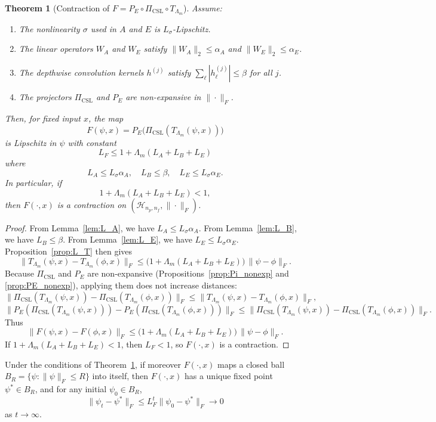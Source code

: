 \documentclass[11pt]{article}
\theoremstyle{definition}
\theoremstyle{plain}
\newtheorem{theorem}{Theorem}
\begin{document}
\begin{theorem}[Contraction of $F = P_E \circ \Pi_{\mathrm{CSL}} \circ T_{\Lambda_m}$]\label{thm:full_contraction}
Assume:
\begin{enumerate}
  \item The nonlinearity $\sigma$ used in $A$ and $E$ is $L_\sigma$-Lipschitz.
  \item The linear operators $W_A$ and $W_E$ satisfy $\|W_A\|_2 \le \alpha_A$ and $\|W_E\|_2 \le \alpha_E$.
  \item The depthwise convolution kernels $h^{(j)}$ satisfy $\sum_\ell |h^{(j)}_\ell| \le \beta$ for all $j$.
  \item The projectors $\Pi_{\mathrm{CSL}}$ and $P_E$ are non-expansive in $\|\cdot\|_F$.
\end{enumerate}
Then, for fixed input $x$, the map
\[
  F(\psi,x) = P_E\bigl(\Pi_{\mathrm{CSL}}(T_{\Lambda_m}(\psi,x))\bigr)
\]
is Lipschitz in $\psi$ with constant
\[
  L_F \le 1 + \Lambda_m(L_A + L_B + L_E)
\]
where
\[
  L_A \le L_\sigma \alpha_A,\quad
  L_B \le \beta,\quad
  L_E \le L_\sigma \alpha_E.
\]
In particular, if
\[
  1 + \Lambda_m(L_A + L_B + L_E) < 1,
\]
then $F(\cdot,x)$ is a contraction on $(\mathcal{H}_{n_p,n_f},\|\cdot\|_F)$.
\end{theorem}

\begin{proof}
From Lemma~\ref{lem:L_A}, we have $L_A \le L_\sigma\alpha_A$.
From Lemma~\ref{lem:L_B}, we have $L_B \le \beta$.
From Lemma~\ref{lem:L_E}, we have $L_E \le L_\sigma\alpha_E$.
Proposition~\ref{prop:L_T} then gives
\[
  \|T_{\Lambda_m}(\psi,x) - T_{\Lambda_m}(\phi,x)\|_F
  \le \bigl(1 + \Lambda_m(L_A+L_B+L_E)\bigr)\,\|\psi - \phi\|_F.
\]
Because $\Pi_{\mathrm{CSL}}$ and $P_E$ are non-expansive (Propositions~\ref{prop:Pi_nonexp} and \ref{prop:PE_nonexp}), applying them does not increase distances:
\[
  \|\Pi_{\mathrm{CSL}}(T_{\Lambda_m}(\psi,x)) - \Pi_{\mathrm{CSL}}(T_{\Lambda_m}(\phi,x))\|_F
  \le \|T_{\Lambda_m}(\psi,x) - T_{\Lambda_m}(\phi,x)\|_F,
\]
\[
  \|P_E(\Pi_{\mathrm{CSL}}(T_{\Lambda_m}(\psi,x))) - P_E(\Pi_{\mathrm{CSL}}(T_{\Lambda_m}(\phi,x)))\|_F
  \le \|\Pi_{\mathrm{CSL}}(T_{\Lambda_m}(\psi,x)) - \Pi_{\mathrm{CSL}}(T_{\Lambda_m}(\phi,x))\|_F.
\]
Thus
\[
  \|F(\psi,x) - F(\phi,x)\|_F
  \le \bigl(1 + \Lambda_m(L_A+L_B+L_E)\bigr)\,\|\psi - \phi\|_F.
\]
If $1 + \Lambda_m(L_A+L_B+L_E) < 1$, then $L_F < 1$, so $F(\cdot,x)$ is a contraction.
\end{proof}

\begin{corollary}\label{cor:fixedpoint}
Under the conditions of Theorem~\ref{thm:full_contraction}, if moreover $F(\cdot,x)$ maps a closed ball $B_R = \{\psi : \|\psi\|_F \le R\}$ into itself, then $F(\cdot,x)$ has a unique fixed point $\psi^\ast \in B_R$, and for any initial $\psi_0 \in B_R$,
\[
  \|\psi_t - \psi^\ast\|_F \le L_F^t \|\psi_0 - \psi^\ast\|_F \to 0
\]
as $t \to \infty$.
\end{corollary}
\end{document}

